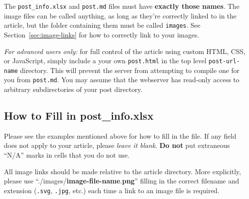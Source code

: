 \documentclass[paper=a4, fontsize=11pt]{scrartcl}
\numberwithin{equation}{section}        %
\numberwithin{figure}{section}            %
\numberwithin{table}{section}                %
\begin{document}
The \texttt{post\_info.xlsx} and \texttt{post.md} files must have
\textbf{exactly those names}. The image files can be called anything, as long as
they're correctly linked to in the article, but the
folder containing them must be called \texttt{images}. See Section~\ref{sec:image-links}
for how to correctly link to your images.

\emph{For advanced users only:} for full control of the article using custom
HTML, CSS, or JavaScript, simply include a your own \texttt{post.html} in
the top level \texttt{post-url-name} directory. This will
prevent the server from attempting to compile one for you from \texttt{post.md}.
You may assume that the webserver has read-only access to arbitrary
subdirectories of your post directory.

\subsection{How to Fill in post\_info.xlsx}\label{sec:excel}
Please see the examples mentioned above for how to fill in the file. If any
field does not apply to your article, please \textit{leave it blank}. \textbf{Do
not} put
extraneous ``N/A'' marks in cells that you do not use.

All image links should be made relative to the article
directory. More explicitly, please use
``./images/\textbf{image-file-name}.\textbf{png}''
filling in the correct filename and extension (\texttt{.svg}, \texttt{.jpg},
etc.) each time a link to an image file is required.
\end{document}
